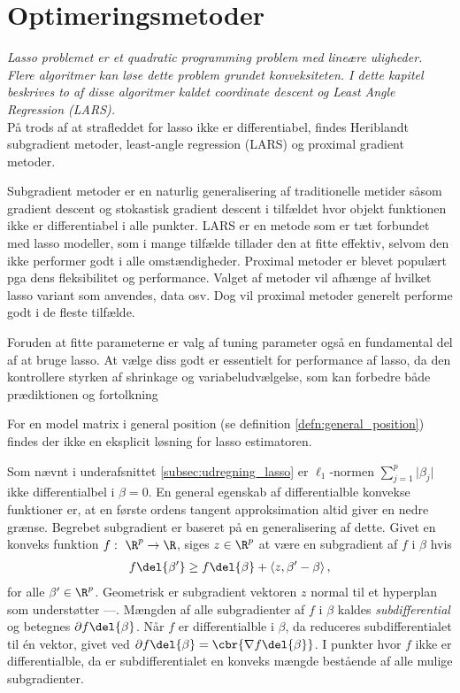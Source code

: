 \chapter{Optimeringsmetoder} \label{kap:optimeringsmetoder}
\textit{Lasso problemet er et quadratic programming problem med lineære uligheder. 
Flere algoritmer kan løse dette problem grundet konveksiteten.  
I dette kapitel beskrives to af disse algoritmer kaldet coordinate descent og Least Angle Regression (LARS).} \\[4mm]
%
På trods af at strafleddet for lasso ikke er differentiabel, findes 
Heriblandt subgradient metoder, least-angle regression (LARS) og proximal gradient metoder.


Subgradient metoder er en naturlig generalisering af traditionelle metider såsom gradient descent og stokastisk gradient descent i tilfældet hvor objekt funktionen ikke er differentiabel i alle punkter.
LARS er en metode som er tæt forbundet med lasso modeller, som i mange tilfælde tillader den at fitte effektiv, selvom den ikke performer godt i alle omstændigheder.
Proximal metoder er blevet populært pga dens fleksibilitet og performance.
Valget af metoder vil afhænge af hvilket lasso variant som anvendes, data osv.
Dog vil proximal metoder generelt performe godt i de fleste tilfælde.


Foruden at fitte parameterne er valg af tuning parameter også en fundamental del af at bruge lasso.
At vælge diss godt er essentielt for performance af lasso, da den kontrollere styrken af shrinkage og variabeludvælgelse, som kan forbedre både prædiktionen og fortolkning

For en model matrix i general position (se definition \ref{defn:general_position}) findes der ikke en eksplicit løsning for lasso estimatoren.

Som nævnt i underafsnittet \ref{subsec:udregning_lasso} er \(\ell_1\)-normen \(\sum_{j=1}^p \vert \beta_j \vert\) ikke differentialbel i \(\beta = 0\).
En general egenskab af differentialble konvekse funktioner er, at en første ordens tangent approksimation altid giver en nedre grænse.
Begrebet subgradient er baseret på en generalisering af dette.
Givet en konveks funktion \(f: \ \R^p \rightarrow \R\), siges \(z \in \R^p\) at være en subgradient af \(f\) i \(\beta\) hvis
\begin{align*}
f \del{\beta'} \geq f \del{\beta} + \left\langle z, \beta' - \beta \right\rangle, 
\end{align*}
for alle \(\beta' \in \R^p\).
Geometrisk er subgradient vektoren \(z\) normal til et hyperplan som understøtter ---.
Mængden af alle subgradienter af \(f\) i \(\beta\) kaldes \textit{subdifferential} og betegnes \(\partial f \del{\beta}\).
Når \(f\) er differentialble i \(\beta\), da reduceres subdifferentialet til én vektor, givet ved \(\partial f \del{\beta} = \cbr{\nabla f \del{\beta}}\).
I punkter hvor \(f\) ikke er differentialble, da er subdifferentialet en konveks mængde bestående af alle mulige subgradienter.

